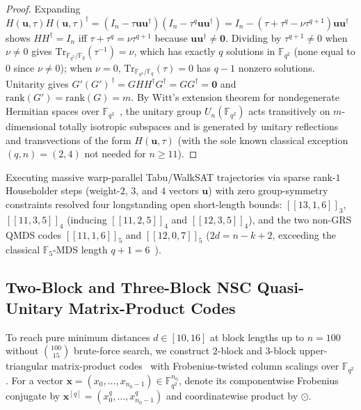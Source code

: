 \documentclass[11pt,a4paper]{article}
\newcommand{\vb}[1]{\symbf{#1}}
\newcommand{\vb}[1]{\mathbf{#1}}
\theoremstyle{remark}
\begin{document}
\begin{proof}
Expanding $H(\vb{u}, \tau) H(\vb{u}, \tau)^\dagger = (I_n - \tau \vb{u}\vb{u}^\dagger)(I_n - \tau^q \vb{u}\vb{u}^\dagger) = I_n - (\tau + \tau^q - \nu \tau^{q+1})\vb{u}\vb{u}^\dagger$ shows $H H^\dagger = I_n$ iff $\tau + \tau^q = \nu \tau^{q+1}$ because $\vb{u}\vb{u}^\dagger \ne \vb{0}$. Dividing by $\tau^{q+1} \ne 0$ when $\nu \ne 0$ gives $\mathrm{Tr}_{\mathbb{F}_{q^2}/\mathbb{F}_q}(\tau^{-1}) = \nu$, which has exactly $q$ solutions in $\mathbb{F}_{q^2}$ (none equal to $0$ since $\nu \ne 0$); when $\nu = 0$, $\mathrm{Tr}_{\mathbb{F}_{q^2}/\mathbb{F}_q}(\tau) = 0$ has $q - 1$ nonzero solutions. Unitarity gives $G'(G')^{\,\dagger} = G H H^\dagger G^\dagger = G G^\dagger = \vb{0}$ and $\mathrm{rank}(G') = \mathrm{rank}(G) = m$. By Witt's extension theorem for nondegenerate Hermitian spaces over $\mathbb{F}_{q^2}$~\cite{Dieudonne1963}, the unitary group $U_n(\mathbb{F}_{q^2})$ acts transitively on $m$-dimensional totally isotropic subspaces and is generated by unitary reflections and transvections of the form $H(\vb{u}, \tau)$ (with the sole known classical exception $(q, n) = (2, 4)$ not needed for $n \ge 11$).
\end{proof}

Executing massive warp-parallel Tabu/WalkSAT trajectories via sparse rank-$1$ Householder steps (weight-$2$, $3$, and $4$ vectors $\vb{u}$) with zero group-symmetry constraints resolved four longstanding open short-length bounds: $[[13,1,6]]_3$, $[[11,3,5]]_4$ (inducing $[[11,2,5]]_4$ and $[[12,3,5]]_4$), and the two non-GRS QMDS codes $[[11,1,6]]_5$ and $[[12,0,7]]_5$ ($2d = n - k + 2$, exceeding the classical $\mathbb{F}_5$-MDS length $q + 1 = 6$~\cite{Ball2021}).

\subsection{Two-Block and Three-Block NSC Quasi-Unitary Matrix-Product Codes}

To reach pure minimum distances $d \in [10, 16]$ at block lengths up to $n = 100$ without $\binom{100}{15}$ brute-force search, we construct $2$-block and $3$-block upper-triangular matrix-product codes~\cite{Blackmore2001,Hernando2009} with Frobenius-twisted column scalings over $\mathbb{F}_{q^2}$. For a vector $\vb{x} = (x_0, \dots, x_{n_0-1}) \in \mathbb{F}_{q^2}^{n_0}$, denote its componentwise Frobenius conjugate by $\vb{x}^{[q]} = (x_0^q, \dots, x_{n_0-1}^q)$ and coordinatewise product by $\odot$.
\end{document}
